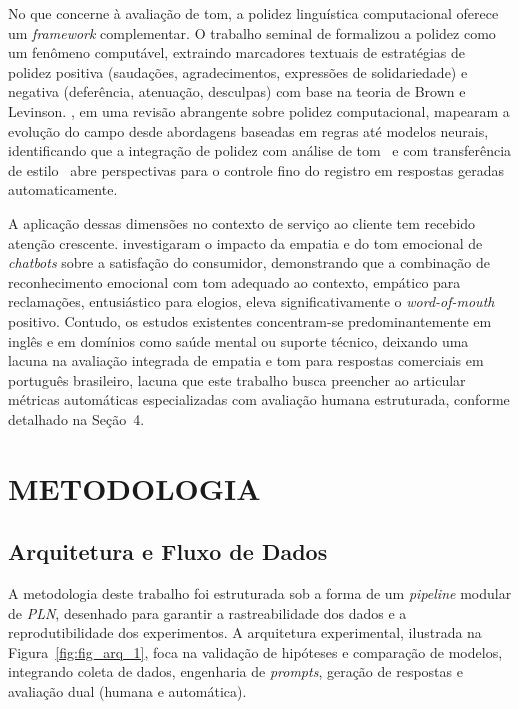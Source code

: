 \documentclass[12pt, a4paper]{article}
\numberwithin{equation}{section}
\begin{document}
No que concerne à avaliação de tom, a polidez linguística computacional oferece um \textit{framework} complementar. O trabalho seminal de  formalizou a polidez como um fenômeno computável, extraindo marcadores textuais de estratégias de polidez positiva (saudações, agradecimentos, expressões de solidariedade) e negativa (deferência, atenuação, desculpas) com base na teoria de Brown e Levinson. , em uma revisão abrangente sobre polidez computacional, mapearam a evolução do campo desde abordagens baseadas em regras até modelos neurais, identificando que a integração de polidez com análise de tom~\cite{balshetwar2019} e com transferência de estilo~\cite{madaan2020} abre perspectivas para o controle fino do registro em respostas geradas automaticamente.

A aplicação dessas dimensões no contexto de serviço ao cliente tem recebido atenção crescente.  investigaram o impacto da empatia e do tom emocional de \textit{chatbots} sobre a satisfação do consumidor, demonstrando que a combinação de reconhecimento emocional com tom adequado ao contexto, empático para reclamações, entusiástico para elogios, eleva significativamente o \textit{word-of-mouth} positivo. Contudo, os estudos existentes concentram-se predominantemente em inglês e em domínios como saúde mental ou suporte técnico, deixando uma lacuna na avaliação integrada de empatia e tom para respostas comerciais em português brasileiro, lacuna que este trabalho busca preencher ao articular métricas automáticas especializadas com avaliação humana estruturada, conforme detalhado na Seção~4.


\newpage

\section{METODOLOGIA}

\subsection{Arquitetura e Fluxo de Dados}

A metodologia deste trabalho foi estruturada sob a forma de um \textit{pipeline} modular de \textit{PLN}, desenhado para garantir a rastreabilidade dos dados e a reprodutibilidade dos experimentos. A arquitetura experimental, ilustrada na Figura~\ref{fig:fig_arq_1}, foca na validação de hipóteses e comparação de modelos, integrando coleta de dados, engenharia de \textit{prompts}, geração de respostas e avaliação dual (humana e automática).
\end{document}
